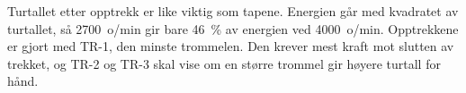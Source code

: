 Turtallet etter opptrekk er like viktig som tapene. Energien går med kvadratet av turtallet, så \SI{2700}{o/min} gir bare \SI{46}{\percent} av energien ved \SI{4000}{o/min}. Opptrekkene er gjort med TR-1, den minste trommelen. Den krever mest kraft mot slutten av trekket, og TR-2 og TR-3 skal vise om en større trommel gir høyere turtall for hånd.

